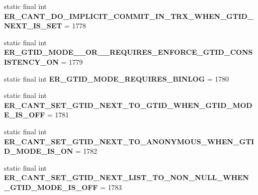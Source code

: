 \begin{DoxyCompactItemize}
\item 
\mbox{\label{classcom_1_1mysql_1_1jdbc_1_1_mysql_error_numbers_a7f8d09ba763305c482aaebd9c30a8af0}} 
static final int {\bfseries E\+R\+\_\+\+C\+A\+N\+T\+\_\+\+D\+O\+\_\+\+I\+M\+P\+L\+I\+C\+I\+T\+\_\+\+C\+O\+M\+M\+I\+T\+\_\+\+I\+N\+\_\+\+T\+R\+X\+\_\+\+W\+H\+E\+N\+\_\+\+G\+T\+I\+D\+\_\+\+N\+E\+X\+T\+\_\+\+I\+S\+\_\+\+S\+ET} = 1778
\item 
\mbox{\label{classcom_1_1mysql_1_1jdbc_1_1_mysql_error_numbers_aadff2d6e2bb45c5b80399d0998a2cd40}} 
static final int {\bfseries E\+R\+\_\+\+G\+T\+I\+D\+\_\+\+M\+O\+D\+E\+\_\+\_\+\+O\+R\+\_\+\_\+\+R\+E\+Q\+U\+I\+R\+E\+S\+\_\+\+E\+N\+F\+O\+R\+C\+E\+\_\+\+G\+T\+I\+D\+\_\+\+C\+O\+N\+S\+I\+S\+T\+E\+N\+C\+Y\+\_\+\+ON} = 1779
\item 
\mbox{\label{classcom_1_1mysql_1_1jdbc_1_1_mysql_error_numbers_adf37014f22e16c8b814af253f0d97c83}} 
static final int {\bfseries E\+R\+\_\+\+G\+T\+I\+D\+\_\+\+M\+O\+D\+E\+\_\+\+R\+E\+Q\+U\+I\+R\+E\+S\+\_\+\+B\+I\+N\+L\+OG} = 1780
\item 
\mbox{\label{classcom_1_1mysql_1_1jdbc_1_1_mysql_error_numbers_af0ebb68c71a0d68eed700f1694838151}} 
static final int {\bfseries E\+R\+\_\+\+C\+A\+N\+T\+\_\+\+S\+E\+T\+\_\+\+G\+T\+I\+D\+\_\+\+N\+E\+X\+T\+\_\+\+T\+O\+\_\+\+G\+T\+I\+D\+\_\+\+W\+H\+E\+N\+\_\+\+G\+T\+I\+D\+\_\+\+M\+O\+D\+E\+\_\+\+I\+S\+\_\+\+O\+FF} = 1781
\item 
\mbox{\label{classcom_1_1mysql_1_1jdbc_1_1_mysql_error_numbers_af6c7b44fa0c84979a65e4c95f2e9a820}} 
static final int {\bfseries E\+R\+\_\+\+C\+A\+N\+T\+\_\+\+S\+E\+T\+\_\+\+G\+T\+I\+D\+\_\+\+N\+E\+X\+T\+\_\+\+T\+O\+\_\+\+A\+N\+O\+N\+Y\+M\+O\+U\+S\+\_\+\+W\+H\+E\+N\+\_\+\+G\+T\+I\+D\+\_\+\+M\+O\+D\+E\+\_\+\+I\+S\+\_\+\+ON} = 1782
\item 
\mbox{\label{classcom_1_1mysql_1_1jdbc_1_1_mysql_error_numbers_a7859c7ddcca2afe41d20d869c895197e}} 
static final int {\bfseries E\+R\+\_\+\+C\+A\+N\+T\+\_\+\+S\+E\+T\+\_\+\+G\+T\+I\+D\+\_\+\+N\+E\+X\+T\+\_\+\+L\+I\+S\+T\+\_\+\+T\+O\+\_\+\+N\+O\+N\+\_\+\+N\+U\+L\+L\+\_\+\+W\+H\+E\+N\+\_\+\+G\+T\+I\+D\+\_\+\+M\+O\+D\+E\+\_\+\+I\+S\+\_\+\+O\+FF} = 1783

\end{DoxyCompactItemize}
